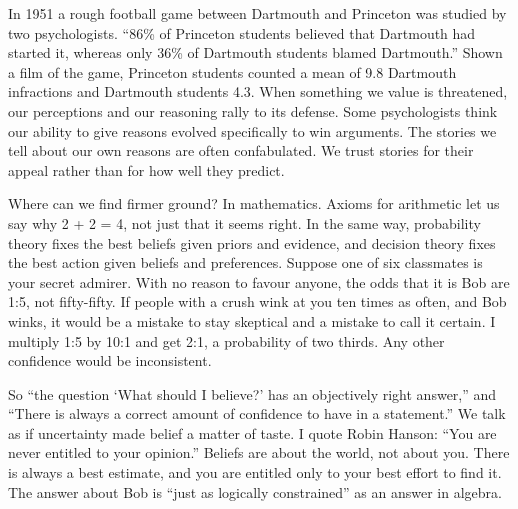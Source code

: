 
In 1951 a rough football game between Dartmouth and Princeton was studied by two psychologists. ``86\% of Princeton students believed that Dartmouth had started it, whereas only 36\% of Dartmouth students blamed Dartmouth.''  Shown a film of the game, Princeton students counted a mean of 9.8 Dartmouth infractions and Dartmouth students 4.3. When something we value is threatened, our perceptions and our reasoning rally to its defense. Some psychologists think our ability to give reasons evolved specifically to win arguments. The stories we tell about our own reasons are often confabulated. We trust stories for their appeal rather than for how well they predict.

Where can we find firmer ground? In mathematics. Axioms for arithmetic let us say why 2 + 2 = 4, not just that it seems right. In the same way, probability theory fixes the best beliefs given priors and evidence, and decision theory fixes the best action given beliefs and preferences. Suppose one of six classmates is your secret admirer. With no reason to favour anyone, the odds that it is Bob are 1:5, not fifty-fifty. If people with a crush wink at you ten times as often, and Bob winks, it would be a mistake to stay skeptical and a mistake to call it certain. I multiply 1:5 by 10:1 and get 2:1, a probability of two thirds. Any other confidence would be inconsistent. 

So ``the question `What should I believe?' has an objectively right answer,'' and ``There is always a correct amount of confidence to have in a statement.''  We talk as if uncertainty made belief a matter of taste. I quote Robin Hanson: ``You are never entitled to your opinion.'' Beliefs are about the world, not about you. There is always a best estimate, and you are entitled only to your best effort to find it. The answer about Bob is ``just as logically constrained'' as an answer in algebra.

